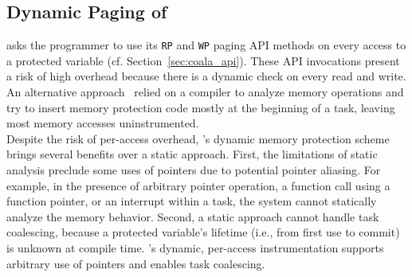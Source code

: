 \subsection{Dynamic Paging of \sys}
%
\sys asks the programmer to use its {\tt RP} and {\tt WP} paging API methods on
every access to a protected variable (cf. Section~\ref{sec:coala_api}).  These
API invocations present a risk of high overhead because there is a dynamic
check on every read and write. An alternative approach~\cite{alpaca} relied on a compiler to analyze memory operations and try to insert memory protection code mostly at the beginning of a task, leaving most
memory accesses uninstrumented.\\
%
Despite the risk of per-access overhead, \sys's dynamic memory protection
scheme brings several benefits over a static approach.  First, the limitations
of static analysis preclude some uses of pointers due to potential pointer
aliasing. For example, in the presence of arbitrary pointer operation, a
function call using a function pointer, or an interrupt within a task, the
system cannot statically analyze the memory behavior.   Second, a static approach
cannot handle task coalescing, because a protected variable's lifetime (i.e.,
from first use to commit) is unknown at compile time. \sys's dynamic,
per-access instrumentation supports arbitrary use of pointers and enables task
coalescing.